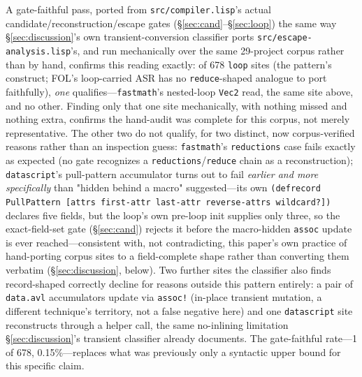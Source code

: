 \documentclass[sigplan,screen,review,anonymous]{acmart}
\begin{document}
A gate-faithful pass, ported from \texttt{src/compiler.lisp}'s actual
candidate/reconstruction/escape gates (\S\ref{sec:cand}--\S\ref{sec:loop})
the same way \S\ref{sec:discussion}'s own transient-conversion classifier
ports \texttt{src/escape-analysis.lisp}'s, and run mechanically over the
same 29-project corpus rather than by hand, confirms this reading exactly:
of 678 \texttt{loop} sites (the pattern's construct; FOL's loop-carried ASR
has no \texttt{reduce}-shaped analogue to port faithfully), \emph{one}
qualifies---\texttt{fastmath}'s nested-loop \texttt{Vec2} read, the same site
above, and no other. Finding only that one site mechanically, with nothing
missed and nothing extra, confirms the hand-audit was complete for this
corpus, not merely representative. The other two do not qualify, for two
distinct, now corpus-verified reasons rather than an inspection guess:
\texttt{fastmath}'s \texttt{reductions} case fails exactly as expected (no
gate recognizes a \texttt{reductions}/\texttt{reduce} chain as a
reconstruction); \texttt{datascript}'s pull-pattern accumulator turns out to
fail \emph{earlier and more specifically} than "hidden behind a macro"
suggested---its own \texttt{(defrecord PullPattern [attrs first-attr
last-attr reverse-attrs wildcard?])} declares five fields, but the loop's
own pre-loop init supplies only three, so the exact-field-set gate
(\S\ref{sec:cand}) rejects it before the macro-hidden \texttt{assoc} update is
ever reached---consistent with, not contradicting, this paper's own
practice of hand-porting corpus sites to a field-complete shape rather than
converting them verbatim (\S\ref{sec:discussion}, below). Two further
sites the classifier also finds record-shaped correctly decline for reasons
outside this pattern entirely: a pair of \texttt{data.avl} accumulators
update via \texttt{assoc!} (in-place transient mutation, a different
technique's territory, not a false negative here) and one
\texttt{datascript} site reconstructs through a helper call, the same
no-inlining limitation \S\ref{sec:discussion}'s transient classifier already
documents. The gate-faithful rate---1 of 678, 0.15\%---replaces what was
previously only a syntactic upper bound for this specific claim.
\end{document}
